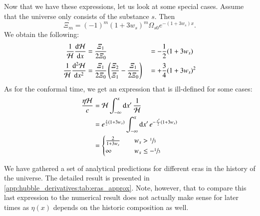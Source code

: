 Now that we have these expressions, let us look at some special cases. Assume that the universe only consists of the substance $s$. Then
\begin{equation}
    \varXi_m = (-1)^m(1+3w_s)^m \Omega_{s0}e^{-(1+3w_s)x}.
\end{equation}
We obtain the following:
\begin{subequations}
    \begin{align}
        \frac{1}{\mathcal{H}} \dv{\mathcal{H}}{x} &= \frac{\varXi_1}{2\varXi_0} &&= - \frac{1}{2}(1+3w_s) \\
        \frac{1}{\mathcal{H}} \dv[2]{\mathcal{H}}{x} &= \frac{\varXi_1}{2\varXi_0} \left( \frac{\varXi_2}{\varXi_1}- \frac{\varXi_1}{2\varXi_0}  \right) &&=+ \frac{3}{4}(1+3w_s)^2
    \end{align}
\end{subequations}
As for the conformal time, we get an expression that is ill-defined for some cases:
\begin{equation}
    \begin{split}
        \frac{\eta \mathcal{H}}{c} &= \mathcal{H} \int_{-\infty}^{x} \mathrm{d} x'\, \frac{1}{\mathcal{H}} \\
            &= e^{\frac{x}{2}(1+3w_s)} \int_{-\infty}^{x} \mathrm{d} x' \,e^{-\frac{x'}{2}(1+3w_s)} \\
            &= \begin{cases}
                \frac{2}{1+3w_s} \quad& w_s > \sfrac{1}{3} \\
                \infty & w_s \leq -\sfrac{1}{3}
            \end{cases}
    \end{split}
\end{equation}

We have gathered a set of analytical predictions for different eras in the history of the universe. The detailed result is presented in \cref{app:hubble_derivatives:tab:eras_approx}. Note, however, that to compare this last expression to the numerical result does not actually make sense for later times as $\eta(x)$ depends on the historic composition as well.

